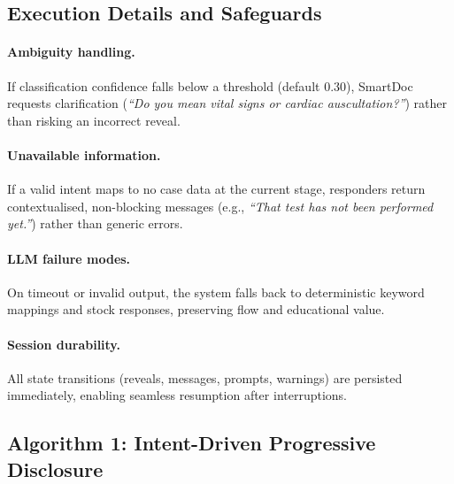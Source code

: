 \subsection{Execution Details and Safeguards}
\label{sec:exec_details}

\paragraph{Ambiguity handling.}
If classification confidence falls below a threshold (default 0.30), SmartDoc requests
clarification (\emph{``Do you mean vital signs or cardiac auscultation?''}) rather
than risking an incorrect reveal.

\paragraph{Unavailable information.}
If a valid intent maps to no case data at the current stage, responders return
contextualised, non-blocking messages (e.g., \emph{``That test has not been performed
yet.''}) rather than generic errors.

\paragraph{LLM failure modes.}
On timeout or invalid output, the system falls back to deterministic keyword
mappings and stock responses, preserving flow and educational value.

\paragraph{Session durability.}
All state transitions (reveals, messages, prompts, warnings) are persisted
immediately, enabling seamless resumption after interruptions.

\subsection{Algorithm 1: Intent-Driven Progressive Disclosure}
\label{sec:algo_progressive}

